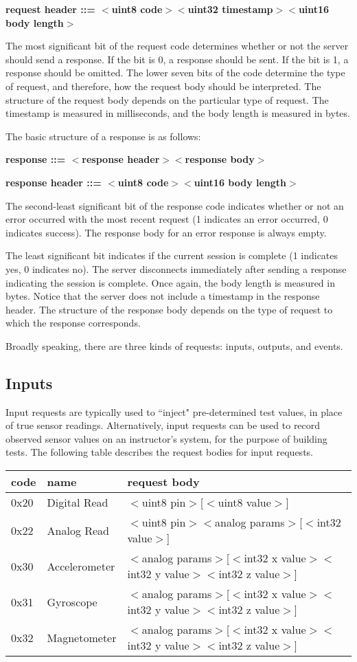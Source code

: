 \documentclass[12pt]{article}
\begin{document}
\textbf{request header ::= $<$uint8 code$>$$<$uint32 timestamp$>$$<$uint16 body length$>$}

\noindent The most significant bit of the request code determines whether or not the server should send a response.  If the bit is 0, a response should be sent.  If the bit is 1, a response should be omitted.  The lower seven bits of the code determine the type of request, and therefore, how the request body should be interpreted.  The structure of the request body depends on the particular type of request.  The timestamp is measured in milliseconds, and the body length is measured in bytes.

The basic structure of a response is as follows:

\textbf{response ::= $<$response header$>$$<$response body$>$}

\textbf{response header ::= $<$uint8 code$>$$<$uint16 body length$>$}

\noindent The second-least significant bit of the response code indicates whether or not an error occurred with the most recent request (1 indicates an error occurred, 0 indicates success).  The response body for an error response is always empty.

The least significant bit indicates if the current session is complete (1 indicates yes, 0 indicates no).  The server disconnects immediately after sending a response indicating the session is complete.  Once again, the body length is measured in bytes.  Notice that the server does not include a timestamp in the response header.  The structure of the response body depends on the type of request to which the response corresponds.

Broadly speaking, there are three kinds of requests: inputs, outputs, and events.

\subsection{Inputs}
Input requests are typically used to ``inject" pre-determined test values, in place of true sensor readings.  Alternatively, input requests can be used to record observed sensor values on an instructor's system, for the purpose of building tests.  The following table describes the request bodies for input requests.

\begin{center}
\begin{tabular}{l l l}
code & name & request body \\ \hline
0x20 & Digital Read & $<$uint8 pin$>$[$<$uint8 value$>$] \\
0x22 & Analog Read & $<$uint8 pin$>$$<$analog params$>$[$<$int32 value$>$] \\
0x30 & Accelerometer & $<$analog params$>$[$<$int32 x value$>$$<$int32 y value$>$$<$int32 z value$>$] \\
0x31 & Gyroscope & $<$analog params$>$[$<$int32 x value$>$$<$int32 y value$>$$<$int32 z value$>$] \\
0x32 & Magnetometer & $<$analog params$>$[$<$int32 x value$>$$<$int32 y value$>$$<$int32 z value$>$] \\ \hline
\end{tabular}
\end{center}
\end{document}
